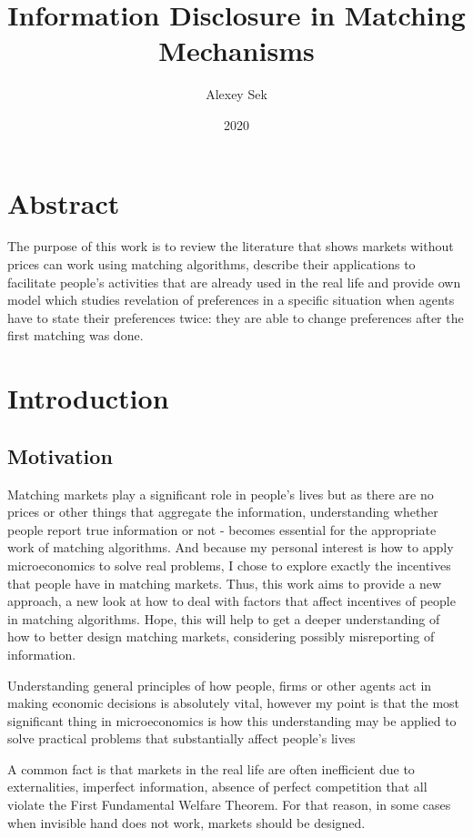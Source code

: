 \documentclass[a4paper]{article} %
\title{Information Disclosure in Matching Mechanisms}
\author{Alexey Sek}
\date{2020}
\begin{document}
\maketitle


\section*{Abstract}

The purpose of this work is to review the literature that shows markets without prices can work using matching algorithms, describe their applications to facilitate people's activities that are already used in the real life and provide own model which studies revelation of preferences in a specific situation when agents have to state their preferences twice: they are able to change preferences after the first matching was done.




\section{Introduction}
\subsection{Motivation}

Matching markets play a significant role in people's lives but as there are no prices or other things that aggregate the information, understanding whether people report true information or not - becomes essential for the appropriate work of matching algorithms.
And because my personal interest is how to apply microeconomics to solve real problems, I chose to explore exactly the incentives that people have in matching markets. Thus, this work aims to provide a new approach, a new look at how to deal with factors that affect incentives of people in matching algorithms. Hope, this will help to get a deeper understanding of how to better design matching markets, considering possibly misreporting of information.

\hfill 
\break
Understanding general principles of how people, firms or other agents act in making economic decisions is absolutely vital, however my point is that the most significant thing in microeconomics is how this understanding may be applied to solve practical problems that substantially affect people's lives

\hfill 
\break
A common fact is that markets in the real life are often inefficient due to externalities, imperfect information, absence of perfect competition that all violate the First Fundamental Welfare Theorem. For that reason, in some cases when invisible hand does not work, markets should be designed.
\end{document}
